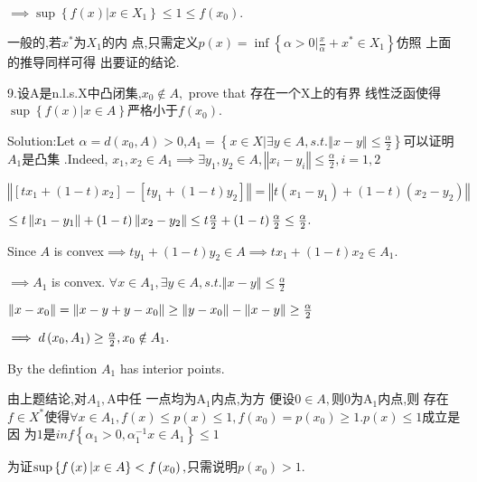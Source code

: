 \documentclass{article}
\begin{document}
\begin{CJK}{GBK}{song}
$\implies \sup \left\{ f\left( x\right) |x\in X_{1}\right\} \leq 1\leq
f\left( x_{0}\right) .$

一般的,若$x^{\ast }$为$X_{1}$的内%
点,只需定义$p\left( x\right) =\inf \left\{
\alpha >0|\frac{x}{\alpha }+x^{\ast }\in X_{1}\right\} $仿照%
上面的推导同样可得%
出要证的结论.

9.设A是n.l.s.X中凸闭集,$x_{0}\notin A,$%
prove that 存在一个X上的有界%
线性泛函使得 $\sup \left\{ f\left(
x\right) |x\in A\right\} $严格小于$f\left(
x_{0}\right) $.

Solution:Let $\alpha =d\left( x_{0},A\right) >0$,$A_{1}=\left\{ x\in
X|\exists y\in A,s.t.\left\Vert x-y\right\Vert \leq \frac{\alpha }{2}%
\right\} $可以证明$A_{1}$是凸集%
.Indeed, $x_{1},x_{2}\in A_{1}\implies \exists y_{1},y_{2}\in A,\left\Vert
x_{i}-y_{i}\right\Vert \leq \frac{\alpha }{2},i=1,2$

$\left\Vert \left[ tx_{1}+\left( 1-t\right) x_{2}\right] -\left[
ty_{1}+\left( 1-t\right) y_{2}\right] \right\Vert =\left\Vert t\left(
x_{1}-y_{1}\right) +\left( 1-t\right) \left( x_{2}-y_{2}\right) \right\Vert $

$\leq t\left\Vert x_{1}-y_{1}\right\Vert +\left( 1-t\right) \left\Vert
x_{2}-y_{2}\right\Vert \leq t\frac{\alpha }{2}+\left( 1-t\right) \frac{%
\alpha }{2}\leq \frac{\alpha }{2}.$

Since $A$ is convex$\implies ty_{1}+\left( 1-t\right) y_{2}\in A\implies
tx_{1}+\left( 1-t\right) x_{2}\in A_{1}.$

$\implies A_{1}$ is convex. $\forall x\in A_{1},\exists y\in
A,s.t.\left\Vert x-y\right\Vert \leq \frac{\alpha }{2}$

$\left\Vert x-x_{0}\right\Vert =\left\Vert x-y+y-x_{0}\right\Vert \geq
\left\Vert y-x_{0}\right\Vert -\left\Vert x-y\right\Vert \geq \frac{\alpha }{%
2}$

$\bigskip \implies d\left( x_{0},A_{1}\right) \geq \frac{\alpha }{2}%
,x_{0}\notin A_{1}.$

By the defintion $A_{1}$ has interior points.

由上题结论,对$A_{1},$A中任%
一点均为A$_{1}$内点,为方%
便设0$\in A,$则0为A$_{1}$内点,则%
存在$f\in X^{\ast }$使得$\forall x\in A_{1},f\left(
x\right) \leq p\left( x\right) \leq 1,f\left( x_{0}\right) =p\left(
x_{0}\right) \geq 1.p\left( x\right) \leq 1$成立是因%
为$1$是$inf\left\{ \alpha _{1}>0,\alpha _{1}^{-1}x\in
A_{1}\right\} \leq 1$

为证$\bigskip \sup \left\{ f\left( x\right) |x\in A\right\}
<f\left( x_{0}\right) ,$只需说明$p\left(
x_{0}\right) >1.$


\end{CJK}
\end{document}
